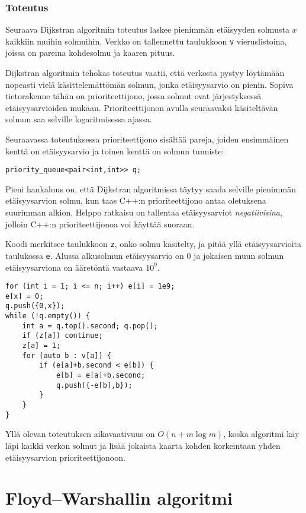 \subsubsection{Toteutus}

Seuraava Dijkstran algoritmin toteutus laskee
pienimmän etäisyyden solmusta $x$ kaikkiin muihin solmuihin.
Verkko on tallennettu taulukkoon \texttt{v}
vieruslistoina, joissa on pareina kohdesolmu
ja kaaren pituus.

Dijkstran algoritmin tehokas toteutus vaatii,
että verkosta pystyy löytämään
nopeasti vielä käsittelemättömän solmun,
jonka etäisyysarvio on pienin.
Sopiva tietorakenne tähän on prioriteettijono,
jossa solmut ovat järjestyksessä etäisyys\-arvioiden mukaan.
Prioriteettijonon avulla
seuraavaksi käsiteltävän solmun saa selville logaritmisessa ajassa.

Seuraavassa toteutuksessa prioriteettijono sisältää
pareja, joiden ensimmäinen kenttä on etäisyysarvio
ja toinen kenttä on solmun tunniste:
\begin{lstlisting}
priority_queue<pair<int,int>> q;
\end{lstlisting}
Pieni hankaluus on,
että Dijkstran algoritmissa täytyy saada selville
pienimmän etäisyysarvion solmu,
kun taas C++:n prioriteettijono antaa oletuksena
suurimman alkion.
Helppo ratkaisu on tallentaa etäisyysarviot
\textit{negatiivisina}, jolloin C++:n prioriteettijonoa
voi käyttää suoraan.

Koodi merkitsee taulukkoon \texttt{z},
onko solmu käsitelty,
ja pitää yllä etäisyysarvioita taulukossa \texttt{e}.
Alussa alkusolmun etäisyysarvio on 0
ja jokaisen muun solmun etäisyysarviona
on ääretöntä vastaava $10^9$.

\begin{lstlisting}
for (int i = 1; i <= n; i++) e[i] = 1e9;
e[x] = 0;
q.push({0,x});
while (!q.empty()) {
    int a = q.top().second; q.pop();
    if (z[a]) continue;
    z[a] = 1;
    for (auto b : v[a]) {
        if (e[a]+b.second < e[b]) {
            e[b] = e[a]+b.second;
            q.push({-e[b],b});
        }
    }
}
\end{lstlisting}

Yllä olevan toteutuksen aikavaativuus on $O(n+m \log m)$,
koska algoritmi käy läpi kaikki verkon solmut
ja lisää jokaista kaarta kohden korkeintaan
yhden etäisyysarvion prioriteettijonoon.

\section{Floyd–Warshallin algoritmi}

